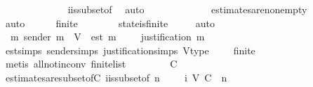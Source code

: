 \begin{isabellebody}
\ \ \isamarkupfalse%
\ \isamarkupfalse%
\ {\isachardoublequoteopen}{\isasymsigma}\ {\isasymin}\ {\isasymSigma}{\isachardoublequoteclose}\isanewline
\ \ \ \ \isamarkupfalse%
\ {\isasymSigma}i{\isacharunderscore}is{\isacharunderscore}subset{\isacharunderscore}of{\isacharunderscore}{\isasymSigma}\ \isamarkupfalse%
\ auto\isanewline
\ \ \isamarkupfalse%
\ {\isachardoublequoteopen}{\isasymepsilon}\ {\isasymsigma}\ {\isasymnoteq}\ {\isasymemptyset}{\isachardoublequoteclose}\isanewline
\ \ \ \ \isamarkupfalse%
\ estimates{\isacharunderscore}are{\isacharunderscore}non{\isacharunderscore}empty\ {\isacartoucheopen}{\isasymsigma}\ {\isasymin}\ {\isasymSigma}{\isacartoucheclose}\ \isamarkupfalse%
\ auto\ \ \isanewline
\ \ \isamarkupfalse%
\ {\isachardoublequoteopen}finite\ {\isasymsigma}{\isachardoublequoteclose}\ \isanewline
\ \ \ \ \isamarkupfalse%
\ state{\isacharunderscore}is{\isacharunderscore}finite\ {\isacartoucheopen}{\isasymsigma}\ {\isasymin}\ {\isasymSigma}{\isacartoucheclose}\ \isamarkupfalse%
\ auto\isanewline
\ \ \isamarkupfalse%
\ \isamarkupfalse%
\ {\isachardoublequoteopen}{\isasymexists}\ m{\isachardot}\ sender\ m\ {\isasymin}\ V\ {\isasymand}\ est\ m\ {\isasymin}\ {\isasymepsilon}\ {\isasymsigma}\ {\isasymand}\ justification\ m\ {\isacharequal}\ {\isasymsigma}{\isachardoublequoteclose}\isanewline
\ \ \ \ \isamarkupfalse%
\ est{\isachardot}simps\ sender{\isachardot}simps\ justification{\isachardot}simps\ V{\isacharunderscore}type\ {\isacartoucheopen}{\isasymepsilon}\ {\isasymsigma}\ {\isasymnoteq}\ {\isasymemptyset}{\isacartoucheclose}\ {\isacartoucheopen}finite\ {\isasymsigma}{\isacartoucheclose}\isanewline
\ \ \ \ \isamarkupfalse%
\ {\isacharparenleft}metis\ all{\isacharunderscore}not{\isacharunderscore}in{\isacharunderscore}conv\ finite{\isacharunderscore}list{\isacharparenright}\isanewline
\ \ \isamarkupfalse%
\ \isamarkupfalse%
\ {\isachardoublequoteopen}{\isasymepsilon}\ {\isasymsigma}\ {\isasymsubseteq}\ C{\isachardoublequoteclose}\isanewline
\ \ \ \ \isamarkupfalse%
\ estimates{\isacharunderscore}are{\isacharunderscore}subset{\isacharunderscore}of{\isacharunderscore}C\ {\isasymSigma}i{\isacharunderscore}is{\isacharunderscore}subset{\isacharunderscore}of{\isacharunderscore}{\isasymSigma}\ {\isacartoucheopen}n\ {\isasymin}\ {\isasymnat}{\isacartoucheclose}\ {\isacartoucheopen}{\isasymsigma}\ {\isasymin}\ {\isasymSigma}{\isacharunderscore}i\ {\isacharparenleft}V{\isacharcomma}\ C{\isacharcomma}\ {\isasymepsilon}{\isacharparenright}\ n{\isacartoucheclose}\ \isamarkupfalse%

\end{isabellebody}
